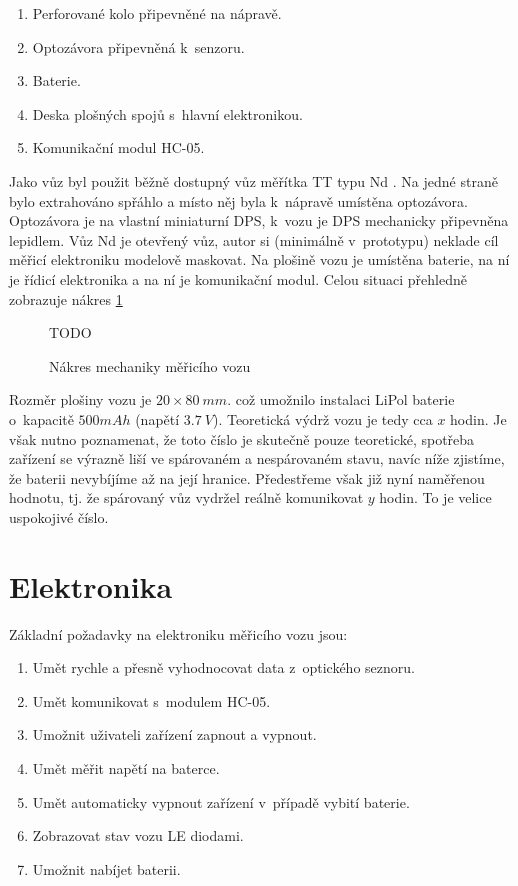 \begin{enumerate}
\item Perforované kolo připevněné na nápravě.
\item Optozávora připevněná k~senzoru.
\item Baterie.
\item Deska plošných spojů s~hlavní elektronikou.
\item Komunikační modul HC-05.
\end{enumerate}

Jako vůz byl použit běžně dostupný vůz měřítka TT typu Nd \cite{vuz-nd}. Na
jedné straně bylo extrahováno spřáhlo a místo něj byla k~nápravě umístěna
optozávora. Optozávora je na vlastní miniaturní DPS, k~vozu je DPS mechanicky
připevněna lepidlem. Vůz Nd je otevřený vůz, autor si (minimálně v~prototypu)
neklade cíl měřicí elektroniku modelově maskovat. Na plošině vozu je umístěna
baterie, na ní je řídicí elektronika a na ní je komunikační modul. Celou
situaci přehledně zobrazuje nákres \ref{fig:vuz-nakres}

\begin{figure}[h]
TODO
\caption{Nákres mechaniky měřicího vozu}
\label{fig:vuz-nakres}
\end{figure}

Rozměr plošiny vozu je $20\times80\ mm$. což umožnilo instalaci LiPol baterie
o~kapacitě $500 mAh$ (napětí $3.7\ V$). Teoretická výdrž vozu je tedy cca $x$
hodin. Je však nutno poznamenat, že toto číslo je skutečně pouze teoretické,
spotřeba zařízení se výrazně liší ve spárovaném a nespárovaném stavu, navíc
níže zjistíme, že baterii nevybíjíme až na její hranice. Předestřeme však již
nyní naměřenou hodnotu, tj. že spárovaný vůz vydržel reálně komunikovat
$y$ hodin. To je velice uspokojivé číslo.

\section{Elektronika}
\label{sec:wsm-ele}

Základní požadavky na elektroniku měřicího vozu jsou:

\begin{enumerate}
\item Umět rychle a přesně vyhodnocovat data z~optického seznoru.
\item Umět komunikovat s~modulem HC-05.
\item Umožnit uživateli zařízení zapnout a vypnout.
\item Umět měřit napětí na baterce.
\item Umět automaticky vypnout zařízení v~případě vybití baterie.
\item Zobrazovat stav vozu LE diodami.
\item Umožnit nabíjet baterii.
\end{enumerate}

